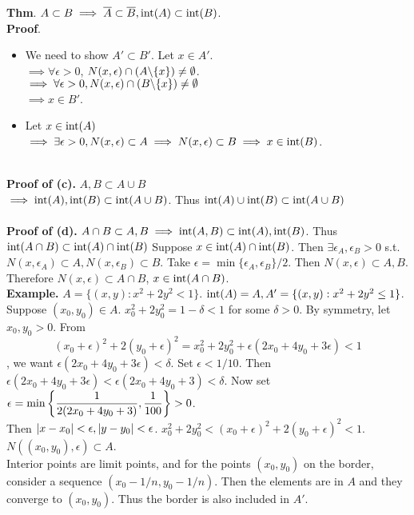 \pagebreak
\textbf{Thm}. $A\subset B \implies \overline{A}\subset \overline{B}, \mathrm{int}(A)\subset \mathrm{int}(B)$.\\
\textbf{Proof}. 
\begin{itemize}
	\item We need to show $A'\subset B'$. Let $x\in A'$.\\
	$\implies$$\forall \epsilon > 0$, $N(x, \epsilon)\cap (A\backslash \{x\}) \neq\emptyset$. \\
	$\implies \forall \epsilon > 0, N(x, \epsilon)\cap (B\backslash \{x\})\neq \emptyset$\\
	$\implies x\in B'$.
	\item Let $x\in \mathrm{int}(A)$\\
	$\implies \exists \epsilon > 0, N(x, \epsilon) \subset A \implies N(x, \epsilon) \subset B \implies x\in \mathrm{int}(B)$.
\end{itemize}
~\\
\textbf{Proof of (c).} $A, B\subset A\cup B$ \\$\implies \mathrm{int}(A), \mathrm{int}(B)\subset \mathrm{int}(A\cup B)$. Thus $\mathrm{int}(A)\cup \mathrm{int}(B)\subset \mathrm{int}(A\cup B)$\\
\\
\textbf{Proof of (d).} $A\cap B \subset A, B \implies \mathrm{int}(A, B) \subset \mathrm{int}(A), \mathrm{int}(B)$. Thus $\mathrm{int}(A\cap B)\subset \mathrm{int}(A)\cap \mathrm{int}(B)$
Suppose $x\in \mathrm{int}(A)\cap \mathrm{int}(B)$. Then $\exists \epsilon_A, \epsilon_B > 0$ s.t. $N(x, \epsilon_A)\subset A, N(x, \epsilon_B)\subset B$. Take $\epsilon = \min\{\epsilon_A, \epsilon_B \}/ 2$. Then $N(x, \epsilon) \subset A, B$. Therefore $N(x, \epsilon) \subset A\cap B$, $x\in \mathrm{int}(A\cap B)$.
~\\
\textbf{Example.} $A = \{(x, y):x^2+2y^2<1 \}$. $\mathrm{int}(A) = A, A' = \{(x, y): x^2+2y^2\leq 1 \}$.\\
Suppose $(x_0, y_0) \in A$. $x_0^2 + 2y_0^2 = 1-\delta < 1$ for some $\delta >0$. By symmetry, let $x_0, y_0 >0$. From
$$(x_0+\epsilon)^2 + 2(y_0+\epsilon)^2 = x_0^2 +2y_0^2 + \epsilon(2x_0 + 4y_0 + 3\epsilon) < 1$$
, we want $\epsilon(2x_0+4y_0+3\epsilon) < \delta$. Set $\epsilon < 1/10$. Then $\epsilon(2x_0 + 4y_0 + 3\epsilon) < \epsilon(2x_0 + 4y_0 +3) < \delta$. Now set $\epsilon = \min\left\{\displaystyle \frac{1}{2 (2x_0+4y_0+3)}, \frac{1}{100}\right\} > 0$.\\ Then $\left|x - x_0\right|<\epsilon, \left|y-y_0\right|<\epsilon$. $x_0^2+2y_0^2 < (x_0+\epsilon) ^2 + 2(y_0+\epsilon)^2 <1$. $N((x_0, y_0), \epsilon) \subset A$.\\
Interior points are limit points, and for the points $(x_0, y_0)$ on the border, consider a sequence $(x_0-1/n, y_0-1/n)$. Then the elements are in $A$ and they converge to $(x_0, y_0)$. Thus the border is also included in $A'$.
\pagebreak